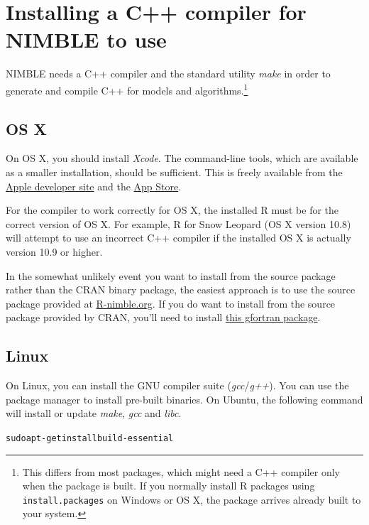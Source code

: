 \documentclass[12pt,oneside]{book}\usepackage[]{graphicx}\usepackage[]{color}
\makeatletter
\newenvironment{kframe}{%
 \def\at@end@of@kframe{}%
 \ifinner\ifhmode%
  \def\at@end@of@kframe{\end{minipage}}%
  \begin{minipage}{\columnwidth}%
 \fi\fi%
 \def\FrameCommand##1{\hskip\@totalleftmargin \hskip-\fboxsep
 \colorbox{shadecolor}{##1}\hskip-\fboxsep
     \hskip-\linewidth \hskip-\@totalleftmargin \hskip\columnwidth}%
 \MakeFramed {\advance\hsize-\width
   \@totalleftmargin\z@ \linewidth\hsize
   \@setminipage}}%
 {\par\unskip\endMakeFramed%
 \at@end@of@kframe}
\newenvironment{knitrout}{}{} %
\def\cd#1{\texttt{#1}}
\def\nm#1{\textit{#1}}
\makeatother
\begin{document}
\section{Installing a C++ compiler for NIMBLE to use}
\label{sec:compiler}

NIMBLE needs a C++ compiler and the standard utility \nm{make} in
order to generate and compile C++ for models and algorithms.\footnote{This differs from most packages, which might need a C++ compiler
  only when the package is built.  If you normally install R packages using
  \cd{install.packages} on Windows or OS X, the package arrives
  already built to your system.}

\subsection{OS X}
On OS X, you should install \nm{Xcode}.  The command-line tools, which are
available as a smaller installation, should be sufficient. This is freely available from the
\href{https://developer.apple.com/xcode/downloads/}{Apple developer
  site} and the
\href{https://itunes.apple.com/us/app/xcode/id497799835?ls=1&mt=12}{App Store}.


For the compiler to work correctly for OS X, the installed R must be
for the correct version of OS X.  For example, R for Snow Leopard (OS
X version 10.8) will attempt to use an incorrect C++ compiler if the
installed OS X is actually version 10.9 or higher.


In the somewhat unlikely event you want to install from the source package rather than the CRAN binary package, the easiest approach is to use the source package provided at \href{http://R-nimble.org}{R-nimble.org}. If you do want to install from the source package provided by CRAN, you'll need to install \href{http://r.research.att.com/libs/gfortran-4.8.2-darwin13.tar.bz2}{this gfortran package}.

\subsection{Linux}
On Linux, you can install the GNU compiler suite (\nm{gcc}/\nm{g++}). 
You can use the package manager to install pre-built binaries.
On Ubuntu, the following command will install or update \nm{make}, \nm{gcc} and \nm{libc}.
\begin{knitrout}
\color{fgcolor}\begin{kframe}
\begin{alltt}
sudo apt-get install build-essential
\end{alltt}
\end{kframe}
\end{knitrout}
\end{document}
